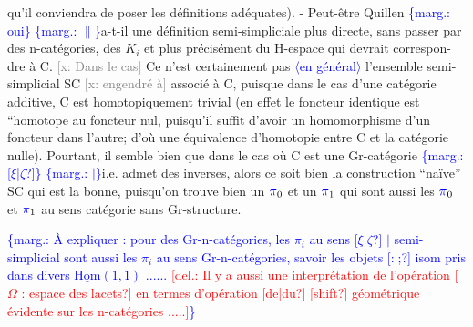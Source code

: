 \documentclass[11pt]{article}
\newcommand{\scanpage}[1]{\par\bigskip\noindent{\small\sffamily[scan #1]}\par}
\newcommand{\mspage}[1]{{\small\sffamily[p.\,#1]}}
\newcommand{\hand}[1]{\textcolor{blue}{#1}}
\newcommand{\inserted}[2][]{\textcolor{blue}{$\langle$#2$\rangle$}}
\newcommand{\margin}[1]{\textcolor{blue}{\{\textsf{marg.:} #1\}}}
\newcommand{\deleted}[1]{\textcolor{red}{[\textsf{del.:} #1]}}
\newcommand{\xout}[1]{\textcolor{gray}{[\textsf{x:} #1]}}
\newcommand{\unsure}[1]{[#1?]}
\begin{document}
\mspage{40}

\clearpage
\scanpage{162-5/41}
qu'il conviendra de poser les définitions adéquates). - Peut-être Quillen
\margin{oui} \margin{$\|$}a-t-il une définition semi-simpliciale plus directe, sans passer par des
n-catégories, des $K_i$ et plus précisément du H-espace qui devrait correspon-%
dre à C. \xout{Dans le cas} Ce n'est certainement pas \inserted[typed]{en général} l'ensemble semi-simplicial
SC \xout{engendré à} associé à C, puisque dans le cas d'une catégorie additive,
C est homotopiquement trivial (en effet le foncteur identique est ``homotope
au foncteur nul, puisqu'il suffit d'avoir un homomorphisme d'un foncteur
dans l'autre; d'où une équivalence d'homotopie entre C et la catégorie
nulle). Pourtant, il semble bien que dans le cas où C est une Gr-catégorie
\margin{\unsure{$\xi$|$\zeta$}} \margin{$|$}i.e. admet des inverses, alors ce soit bien la construction ``naïve'' SC qui
est la bonne, puisqu'on trouve bien un $\hand{\pi}_0$ et un $\hand{\pi}_1$ qui sont aussi les
$\hand{\pi}_0$ et $\hand{\pi}_1$ au sens  catégorie sans Gr-structure.

\margin{À expliquer : pour des Gr-n-catégories, les $\pi_i$ au sens
\unsure{$\xi$|$\zeta$} $|$ semi-simplicial sont aussi les $\pi_i$ au sens Gr-n-catégories,
savoir les objets \unsure{:|;} isom pris dans divers $\underline{\mathrm{Hom}}(1,1)$ ...... \deleted{Il y a
aussi une interprétation de l'opération \unsure{$\Omega$ : espace des lacets}
en termes d'opération \unsure{de|du} \unsure{shift} géométrique évidente sur les
n-catégories .....}}

\mspage{41}

\clearpage
\scanpage{162-5/42}
\mspage{42}
\end{document}
